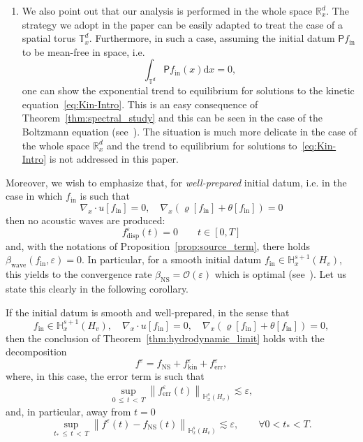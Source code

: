 \documentclass[AHL,Unicode,longabstracts,published]{cedram}
\newcommand{\ini}{\mathrm{in}}
\newcommand{\err}{\mathrm{err}}
\newcommand{\ns}{\mathrm{NS}}
\newcommand{\kin}{\mathrm{kin}}
\renewcommand{\d}{\mathrm{d}}
\newcommand{\Wave}{\mathrm{wave}}
\newcommand{\disp}{\mathrm{disp}}
\newcommand{\R}{\mathbb{R}}
\newcommand{\T}{\mathbb{T}}
\newcommand{\bbH}{\mathbb{H}}
\newcommand{\OO}{\mathcal{O}}
\newcommand{\PP}{\mathsf{P}}
\newcommand{\Ss}{H}
\renewcommand*\le{\leqslant}
\newcommand*\eps{{\varepsilon}}
\newcommand{\thttl}[1]{\emph{\textbf{#1}}}
\let\oldforall\forall
\renewcommand*{\forall}{\mathrel{\oldforall}}
\begin{document}
\begin{enumerate}
\item We also point out that our analysis is performed in the whole space $\R^{d}_{x}$. The strategy we adopt in the paper can be easily adapted to treat the case of a spatial torus $\T^{d}_{x}$. Furthermore, in such a case, assuming the initial datum $\PP f_\ini$ to be mean-free in space, i.e.
\[
\int_{\T^d} \PP f_\ini(x) \d x = 0,
\]
one can show the exponential trend to equilibrium for solutions to the kinetic equation~\eqref{eq:Kin-Intro}. This is an easy consequence of Theorem~\ref{thm:spectral_study} and this can be seen in the case of the Boltzmann equation (see~\cite{BMM2019,G2023, GMM2017,GT2020}). The situation is much more delicate in the case of the whole space $\R^{d}_{x}$ and the trend to equilibrium for solutions to~\eqref{eq:Kin-Intro} is not addressed in this paper.
\end{enumerate}
Moreover, we wish to emphasize that, for \emph{well-prepared} initial datum, i.e. in the case in which $f_{\ini}$ is such that
\[
\nabla_x\cdot u[f_\ini]=0, \quad \nabla_x\left(\varrho[f_\ini]+\theta[f_\ini]\right)=0
\]
then {no acoustic waves are produced:}
\[
f^\eps_\disp(t)=0 \qquad t \in [0,T]
\]
and, with the notations of Proposition~\ref{prop:source_term}, there holds $\beta_\Wave(f_\ini,\eps)=0$. In particular, for a smooth initial datum $f_\ini \in \bbH^{s+1}_x(\Ss_v)$, this yields to the convergence rate {$\beta_{\ns} = \OO(\eps)$} which is optimal (see~\cite{G2006}). Let us state this clearly in the following corollary.


\begin{coro}[\thttl{Optimal convergence rate}]
If the initial datum is smooth and well-prepared, in the sense that
\begin{equation}\label{eq:addi}
f_\ini \in \bbH^{s+1}_x \left(\Ss_v \right), \quad \nabla_x\cdot u[f_\ini]=0, \quad \nabla_x\left(\varrho[f_\ini]+\theta[f_\ini]\right)=0,
\end{equation}
then the conclusion of Theorem~\ref{thm:hydrodynamic_limit} holds with the decomposition
\[
f^\eps = f_\ns + f^\eps_\kin + f^\eps_\err,
\]
where, in this case, the error term is such that
\begin{gather*}
\sup_{0\,\le\,t\,<\,T} \left\| f^\eps_\err(t) \right\|_{ \bbH^s_x \left(\Ss_v \right) } \lesssim \eps,
\end{gather*}
and, in particular, away from $t=0$
\[
\sup_{t_*\,\le\,t\,<\,T} \left\| f^\eps(t) - f_\ns(t) \right\|_{ \bbH^s_x \left(\Ss_v \right) } \lesssim \eps, \qquad \forall 0 < t_* < T.
\]
\end{coro}
\end{document}
